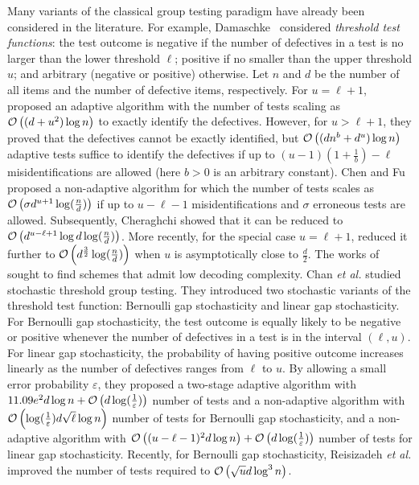 \documentclass[onecolumn,letterpaper]{IEEEtran}
\begin{document}
Many variants of the classical group testing paradigm have already been considered in the literature. For example, Damaschke~\cite{damaschke2006threshold} considered {\it threshold test functions}: the test outcome is negative if the number of defectives in a test is no larger than the lower threshold $\ell$; positive if no smaller than the upper threshold $u$; and arbitrary (negative or positive) otherwise. Let $n$ and $d$ be the number of all items and the number of defective items, respectively. For $u=\ell+1$,~\cite{damaschke2006threshold} proposed an adaptive algorithm with the number of tests scaling as ${\cal O}\left( (d+u^2) \log n\right)$ to exactly identify the defectives. However, for $u>\ell+1$, they proved that the defectives cannot be exactly identified, but ${\cal O}\left( (dn^b+d^u) \log n\right)$ adaptive tests suffice to identify the defectives if up to $(u-1)(1+\frac{1}{b})-\ell$ misidentifications are allowed (here $b>0$ is an arbitrary constant). Chen and Fu \cite{chen2009nonadaptive} proposed a non-adaptive algorithm for which the number of tests scales as ${\cal O}\left( \sigma d^{u+1} \log (\frac n d)\right)$ if up to $u-\ell-1$ misidentifications and $\sigma$ erroneous tests are allowed. Subsequently, Cheraghchi \cite{cheraghchi2010improved} showed that it can be reduced to ${\cal O}\left( d^{u-\ell+1} \log d \log (\frac n d)\right)$. More recently, for the special case $u=\ell+1$, \cite{de2020} reduced it further to ${\cal O}\left( d^{\frac 3 2}  \log (\frac n d)\right)$ when $u$ is asymptotically close to $\frac d 2$. The works of~\cite{bui2019,bui2020} sought to find schemes that admit low decoding complexity. Chan {\it et al.} \cite{sid13itw} studied stochastic threshold group testing. They introduced two stochastic variants of the threshold test function: Bernoulli gap stochasticity and linear gap stochasticity. For Bernoulli gap stochasticity, the test outcome is equally likely to be negative or positive whenever the number of defectives in a test is in the interval $(\ell, u)$. For linear gap stochasticity, the probability of having positive outcome increases linearly as the number of defectives ranges from $\ell$ to $u$. By allowing a small error probability $\varepsilon$, they proposed a two-stage adaptive algorithm with $11.09e^2d \log n +{\cal O}\left(d\log( \frac{1} {\varepsilon})\right)$ number of tests and a non-adaptive algorithm with ${\cal O}\left(\log(\frac {1} {\varepsilon})d\sqrt{\ell}\log n\right)$ number of tests for Bernoulli gap stochasticity, and a non-adaptive algorithm with ${\cal O}\left((u-\ell-1)^2d\log n\right)+{\cal O}\left(d\log(\frac {1} {\varepsilon})\right)$ number of tests for linear gap stochasticity. Recently,  for Bernoulli gap stochasticity,  Reisizadeh {\it et al.} \cite{reisizadeh2018} improved the number of tests required to ${\cal O}\left(\sqrt{u}d\log ^3 n \right)$.
\end{document}
